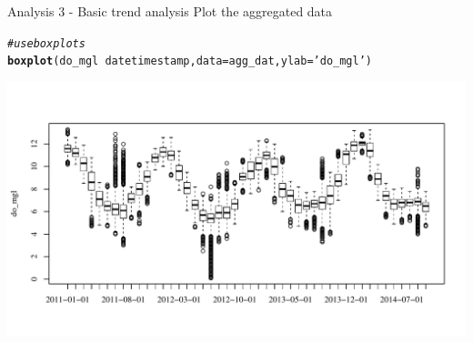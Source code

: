 \documentclass[xcolor=svgnames]{beamer}\usepackage[]{graphicx}\usepackage[]{color}
\makeatletter
\newcommand{\hlstr}[1]{\textcolor[rgb]{0.192,0.494,0.8}{#1}}%
\newcommand{\hlcom}[1]{\textcolor[rgb]{0.678,0.584,0.686}{\textit{#1}}}%
\newcommand{\hlopt}[1]{\textcolor[rgb]{0,0,0}{#1}}%
\newcommand{\hlstd}[1]{\textcolor[rgb]{0.345,0.345,0.345}{#1}}%
\newcommand{\hlkwc}[1]{\textcolor[rgb]{0.333,0.667,0.333}{#1}}%
\newcommand{\hlkwd}[1]{\textcolor[rgb]{0.737,0.353,0.396}{\textbf{#1}}}%
\newenvironment{kframe}{%
 \def\at@end@of@kframe{}%
 \ifinner\ifhmode%
  \def\at@end@of@kframe{\end{minipage}}%
  \begin{minipage}{\columnwidth}%
 \fi\fi%
 \def\FrameCommand##1{\hskip\@totalleftmargin \hskip-\fboxsep
 \colorbox{shadecolor}{##1}\hskip-\fboxsep
     \hskip-\linewidth \hskip-\@totalleftmargin \hskip\columnwidth}%
 \MakeFramed {\advance\hsize-\width
   \@totalleftmargin\z@ \linewidth\hsize
   \@setminipage}}%
 {\par\unskip\endMakeFramed%
 \at@end@of@kframe}
\newenvironment{knitrout}{}{} %
\makeatother
\begin{document}
\begin{frame}[containsverbatim]{Analysis 3 - Basic trend analysis}
Plot the aggregated data
\begin{knitrout}\scriptsize
{}\color{fgcolor}\begin{kframe}
\begin{alltt}
\hlcom{# use boxplots }
\hlkwd{boxplot}\hlstd{(do_mgl} \hlopt{~} \hlstd{datetimestamp,} \hlkwc{data} \hlstd{= agg_dat,} \hlkwc{ylab} \hlstd{=} \hlstr{'do_mgl'}\hlstd{)}
\end{alltt}
\end{kframe}

{\centering \includegraphics[width=\textwidth]{figure/unnamed-chunk-21} 

}



\end{knitrout}
\end{frame}
\end{document}
